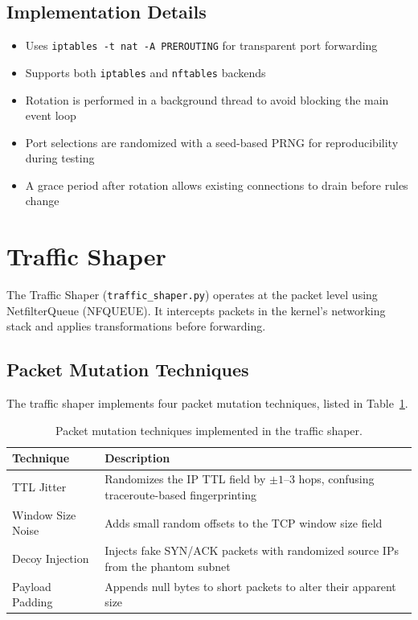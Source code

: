 \documentclass[12pt,a4paper]{report}
\begin{document}
\subsection{Implementation Details}

\begin{itemize}
    \item Uses \texttt{iptables -t nat -A PREROUTING} for transparent port forwarding
    \item Supports both \texttt{iptables} and \texttt{nftables} backends
    \item Rotation is performed in a background thread to avoid blocking the main event loop
    \item Port selections are randomized with a seed-based PRNG for reproducibility during testing
    \item A grace period after rotation allows existing connections to drain before rules change
\end{itemize}

\section{Traffic Shaper}

The Traffic Shaper (\texttt{traffic\_shaper.py}) operates at the packet level using NetfilterQueue (NFQUEUE). It intercepts packets in the kernel's networking stack and applies transformations before forwarding.

\subsection{Packet Mutation Techniques}

The traffic shaper implements four packet mutation techniques, listed in Table~\ref{tab:mutations}.

\begin{table}[H]
\centering
\caption{Packet mutation techniques implemented in the traffic shaper.}
\label{tab:mutations}
\begin{tabular}{lp{9cm}}
\toprule
\textbf{Technique} & \textbf{Description} \\
\midrule
TTL Jitter & Randomizes the IP TTL field by $\pm 1$--$3$ hops, confusing traceroute-based fingerprinting \\
Window Size Noise & Adds small random offsets to the TCP window size field \\
Decoy Injection & Injects fake SYN/ACK packets with randomized source IPs from the phantom subnet \\
Payload Padding & Appends null bytes to short packets to alter their apparent size \\
\bottomrule
\end{tabular}
\end{table}
\end{document}
